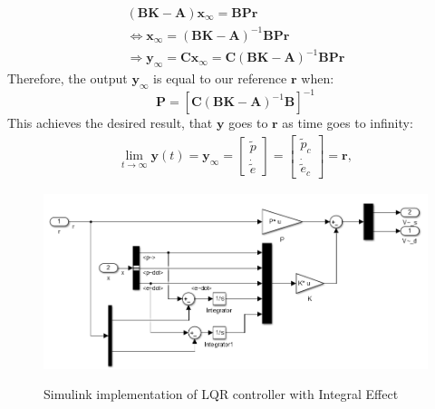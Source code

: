 \begin{align*}
  (\boldsymbol{BK} - \boldsymbol{A})\boldsymbol{x_\infty} = \boldsymbol{BPr} \\
  \Leftrightarrow \boldsymbol{x_\infty} = (\boldsymbol{BK} - \boldsymbol{A})^{-1}\boldsymbol{BPr} \\
  \Rightarrow \boldsymbol{y_\infty} = \boldsymbol{Cx_\infty} = \boldsymbol{C}(\boldsymbol{BK} - \boldsymbol{A})^{-1}\boldsymbol{BPr}
\end{align*}
Therefore, the output $\boldsymbol{y_\infty}$ is equal to our
reference $\boldsymbol{r}$ when:
\begin{equation}
  \boldsymbol{P} = [\boldsymbol{C}(\boldsymbol{BK} -
  \boldsymbol{A})^{-1}\boldsymbol{B}]^{-1}
\end{equation}
This achieves the desired result, that $\boldsymbol{y}$  goes to
$\boldsymbol{r}$  as time goes to infinity:
\begin{align*}
  \lim_{t\to\infty}\boldsymbol{y}(t) = \boldsymbol{y_\infty} =
  \begin{bmatrix}
    \tilde{p} \\
    \dot{\tilde{e}}
  \end{bmatrix}
  =
  \begin{bmatrix}
    \tilde{p}_c \\
    \dot{\tilde{e}}_c
  \end{bmatrix}
  = \boldsymbol{r},
\end{align*}



\begin{figure}
\caption{Simulink implementation of LQR controller with Integral Effect}
	\centering
		\includegraphics[scale=0.6]{images/LQRIntegralEffect.png}
	\label{fig:LQR controller with Integral Effect}
\end{figure}

